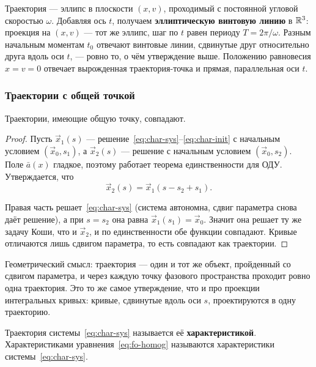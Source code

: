 
\begin{idea}
Траектория — эллипс в плоскости $(x,v)$, проходимый с постоянной угловой
скоростью $\omega$. Добавляя ось $t$, получаем \textbf{эллиптическую винтовую
линию} в $\mathbb{R}^3$: проекция на $(x,v)$ — тот же эллипс, шаг по $t$ равен периоду
$T = 2\pi/\omega$. Разным начальным моментам $t_0$ отвечают винтовые линии,
сдвинутые друг относительно друга вдоль оси $t$, — ровно то, о чём утверждение
выше. Положению равновесия $x = v = 0$ отвечает вырожденная траектория-точка и
прямая, параллельная оси $t$.
\end{idea}

\subsubsection*{Траектории с общей точкой}

\begin{proposition}\label{prop:traj-coincide}
Траектории, имеющие общую точку, совпадают.
\end{proposition}

\begin{proof}
Пусть $\vec x_1(s)$ — решение~\eqref{eq:char-sys}--\eqref{eq:char-init} с
начальным условием $(\vec x_0, s_1)$, а $\vec x_2(s)$ — решение с начальным
условием $(\vec x_0, s_2)$. Поле $\bar a(x)$ гладкое, поэтому работает теорема
единственности для ОДУ. Утверждается, что
\[
  \vec x_2(s) = \vec x_1(s - s_2 + s_1) .
\]

Правая часть решает~\eqref{eq:char-sys} (система автономна, сдвиг
параметра снова даёт решение), а при $s = s_2$ она равна
$\vec x_1(s_1) = \vec x_0$. Значит она решает ту же задачу Коши, что и
$\vec x_2$, и по единственности обе функции совпадают. Кривые отличаются лишь
сдвигом параметра, то есть совпадают как траектории.
\end{proof}

\begin{idea}
Геометрический смысл: траектория — один и тот же объект, пройденный со сдвигом
параметра, и через каждую точку фазового пространства проходит ровно одна
траектория. Это то же самое утверждение, что и про проекции интегральных
кривых: кривые, сдвинутые вдоль оси $s$, проектируются в одну траекторию.
\end{idea}

\begin{definition}
Траектория системы~\eqref{eq:char-sys} называется её
\textbf{характеристикой}. Характеристиками уравнения~\eqref{eq:fo-homog}
называются характеристики системы~\eqref{eq:char-sys}.
\end{definition}

